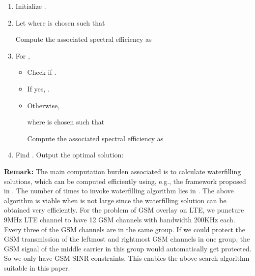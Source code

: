 \documentclass[10pt,journal]{IEEEtran}
\theoremstyle{slplain}
\begin{document}
\begin{enumerate}
\item Initialize .
\item Let 
where  is chosen such that

Compute the associated spectral efficiency as

\item For ,
\begin{itemize}
\item Check if .
\item If yes, .
\item Otherwise,

where  is chosen such that

Compute the associated spectral efficiency as

\end{itemize}
\item Find . Output the optimal solution:

\end{enumerate}

\textbf{Remark:} The main computation burden associated is to calculate waterfilling solutions, which can be computed efficiently using, e.g., the framework proposed in \cite{Palomar2005Practical}. The number of times to invoke waterfilling algorithm lies in . The above algorithm is viable when  is not large since the waterfilling solution can be obtained very efficiently. For the problem of GSM overlay on LTE, we puncture 9MHz LTE channel to have 12 GSM channels with bandwidth 200KHz each. Every three of the GSM channels are in the same group. If we could protect the GSM transmission of the leftmost and rightmost GSM channels in one group, the GSM signal of the middle carrier in this group would automatically get protected. So we only have  GSM SINR constraints. This enables the above search algorithm suitable in this paper.







\end{document}
